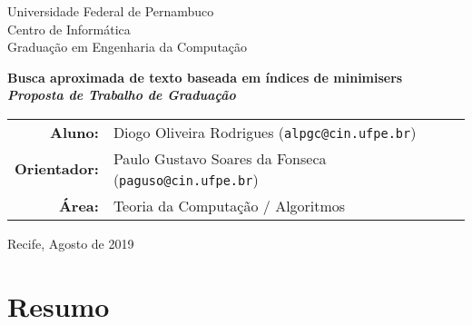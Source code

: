 \documentclass[12pt, a4paper, oneside]{article}
\begin{document}


\thispagestyle{empty}
\begin{center}
\Large
Universidade Federal de Pernambuco\\
Centro de Informática\\
Graduação em Engenharia da Computação

\vfill

{\huge \bfseries Busca aproximada de texto baseada em índices de minimisers}
\\
\medskip
{\bfseries\itshape Proposta de Trabalho de Graduação}

\vfill

\bigskip

	\begin{tabular}{r p{100mm}}
	\textbf{Aluno: } & Diogo Oliveira Rodrigues \newline(\texttt{alpgc@cin.ufpe.br}) \\ 
\textbf{Orientador: } & Paulo Gustavo Soares da Fonseca \newline(\texttt{paguso@cin.ufpe.br})
\\
	\textbf{Área: } & Teoria da Computação / Algoritmos
\end{tabular}

	\vspace{3cm}
Recife, Agosto de 2019
\end{center}

\clearpage 
\thispagestyle{empty}
\section{Resumo}
\end{document}
